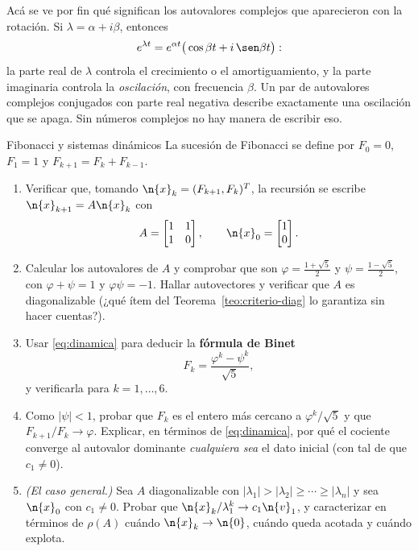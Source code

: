 \begin{remark}
Acá se ve por fin qué significan los autovalores complejos que aparecieron con la
rotación. Si $\lambda=\alpha+i\beta$, entonces
\[
e^{\lambda t}=e^{\alpha t}\big(\cos\beta t+i\,\sen\beta t\big):
\]
la parte real de $\lambda$ controla el crecimiento o el amortiguamiento, y la parte
imaginaria controla la \emph{oscilación}, con frecuencia $\beta$. Un par de autovalores
complejos conjugados con parte real negativa describe exactamente una oscilación que se
apaga. Sin números complejos no hay manera de escribir eso.
\end{remark}

\begin{entrega}{Fibonacci y sistemas dinámicos}\label{ent:fibonacci}
La sucesión de Fibonacci se define por $F_0=0$, $F_1=1$ y
$F_{k+1}=F_k+F_{k-1}$.

\begin{enumerate}[label=\textbf{(\alph*)},itemsep=3pt,topsep=4pt]
\item Verificar que, tomando $\n{x}_k=(F_{k+1},F_k)^T$, la recursión se escribe
$\n{x}_{k+1}=A\n{x}_k$ con
\[
A=\begin{bmatrix}1&1\\ 1&0\end{bmatrix},
\qquad \n{x}_0=\begin{bmatrix}1\\ 0\end{bmatrix}.
\]

\item Calcular los autovalores de $A$ y comprobar que son
$\varphi=\frac{1+\sqrt5}{2}$ y $\psi=\frac{1-\sqrt5}{2}$, con
$\varphi+\psi=1$ y $\varphi\psi=-1$. Hallar autovectores y verificar que $A$ es
diagonalizable (¿qué ítem del Teorema~\ref{teo:criterio-diag} lo garantiza sin hacer
cuentas?).

\item Usar \eqref{eq:dinamica} para deducir la \textbf{fórmula de Binet}
\[
F_k=\frac{\varphi^{k}-\psi^{k}}{\sqrt5},
\]
y verificarla para $k=1,\dots,6$.

\item Como $|\psi|<1$, probar que $F_k$ es el entero más cercano a
$\varphi^{k}/\sqrt5$ y que $F_{k+1}/F_k\to\varphi$. Explicar, en términos de
\eqref{eq:dinamica}, por qué el cociente converge al autovalor dominante
\emph{cualquiera sea} el dato inicial (con tal de que $c_1\neq0$).

\item \emph{(El caso general.)} Sea $A$ diagonalizable con
$|\lambda_1|>|\lambda_2|\ge\cdots\ge|\lambda_n|$ y sea $\n{x}_0$ con $c_1\neq0$.
Probar que $\n{x}_k/\lambda_1^{k}\to c_1\n{v}_1$, y caracterizar en términos de
$\rho(A)$ cuándo $\n{x}_k\to\n{0}$, cuándo queda acotada y cuándo explota.


\end{enumerate}
\end{entrega}
